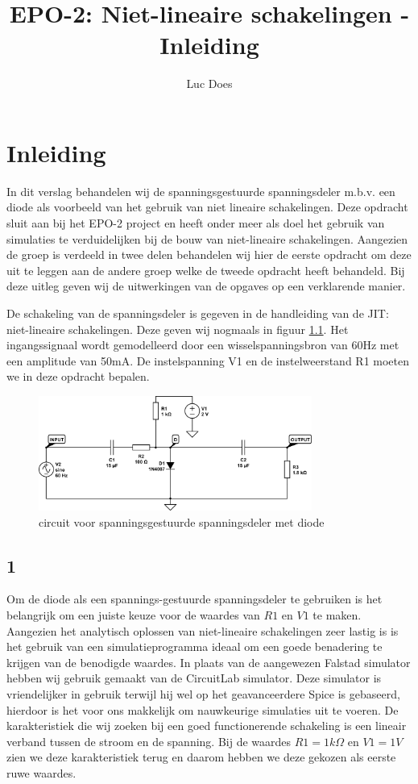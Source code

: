 \documentclass{report}
\title{EPO-2: Niet-lineaire schakelingen - Inleiding}
\author{Luc Does}
\begin{document}
\chapter{Inleiding}
\label{ch:inleiding}

In dit verslag behandelen wij de spanningsgestuurde spanningsdeler m.b.v. een diode als voorbeeld van het gebruik van niet lineaire schakelingen. Deze opdracht sluit aan bij het EPO-2 project en heeft onder meer als doel het gebruik van simulaties te verduidelijken bij de bouw van niet-lineaire schakelingen. \newline
Aangezien de groep is verdeeld in twee delen behandelen wij hier de eerste opdracht om deze uit te leggen aan de andere groep welke de tweede opdracht heeft behandeld. Bij deze uitleg geven wij de uitwerkingen van de opgaves op een verklarende manier.
\newline

\noindent De schakeling van de spanningsdeler is gegeven in de handleiding van de JIT: niet-lineaire schakelingen. Deze geven wij nogmaals in figuur \ref{fig:totaalschema}. Het ingangssignaal wordt gemodelleerd door een wisselspanningsbron van 60Hz met een amplitude van 50mA. De instelspanning V1 en de instelweerstand R1 moeten we in deze opdracht bepalen.

\begin{figure}[H]
	\centering
	\includegraphics[width=0.8\textwidth]{totaal-circuit-spanningsgestuurde-spanningsdeler.png}
	\caption{circuit voor spanningsgestuurde spanningsdeler met diode}
	\label{fig:totaalschema}
\end{figure}


\section{1}
Om de diode als een spannings-gestuurde spanningsdeler te gebruiken is het belangrijk om een juiste keuze voor de waardes van $R1$ en $V1$ te maken. Aangezien het analytisch oplossen van niet-lineaire schakelingen zeer lastig is is het gebruik van een simulatieprogramma ideaal om een goede benadering te krijgen van de benodigde waardes. In plaats van de aangewezen Falstad simulator hebben wij gebruik gemaakt van de CircuitLab simulator. Deze simulator is vriendelijker in gebruik terwijl hij wel op het geavanceerdere  Spice is gebaseerd, hierdoor is het voor ons makkelijk om nauwkeurige simulaties uit te voeren.
\newline
De karakteristiek die wij zoeken bij een goed functionerende schakeling is een lineair verband tussen de stroom en de spanning. Bij de waardes $R1 = 1k\Omega$ en $V1 = 1V$ zien we deze karakteristiek terug en daarom hebben we deze gekozen als eerste ruwe waardes.
\end{document}
